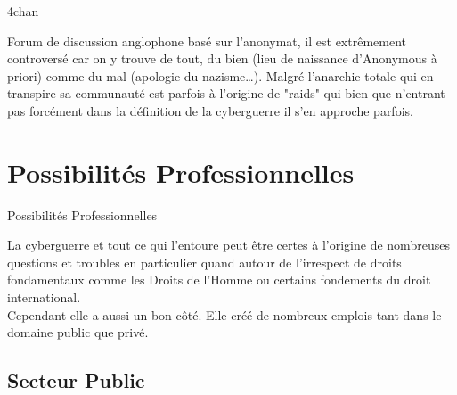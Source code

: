 \documentclass{beamer}
\begin{document}
\begin{frame}{4chan}

Forum de discussion anglophone basé sur l'anonymat, il est extrêmement controversé car on y trouve de tout, du bien (lieu de naissance d'Anonymous à priori) comme du mal (apologie du nazisme\dots). Malgré l'anarchie totale qui en transpire sa communauté est parfois à l'origine de "raids" qui bien que n'entrant pas forcément dans la définition de la cyberguerre il s'en approche parfois.


\end{frame}

\section{Possibilités Professionnelles}

\begin{frame}{Possibilités Professionnelles}
   
    La cyberguerre et tout ce qui l'entoure peut être certes à l'origine de nombreuses questions et troubles en particulier quand autour de l'irrespect de droits fondamentaux comme les Droits de l'Homme ou certains fondements du droit international.\\
    \vspace{10pt}
    Cependant elle a aussi un bon côté. Elle créé de nombreux emplois tant dans le domaine public que privé.
    
\end{frame}

\subsection{Secteur Public}
\end{document}
